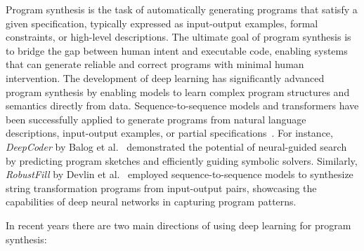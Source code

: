 \documentclass[pdflatex,sn-mathphys-num]{sn-jnl}%
\theoremstyle{thmstyleone}%
\theoremstyle{thmstyletwo}%
\theoremstyle{thmstylethree}%
\begin{document}
Program synthesis is the task of automatically generating programs that satisfy a given specification, typically expressed as input-output examples, formal constraints, or high-level descriptions. The ultimate goal of program synthesis is to bridge the gap between human intent and executable code, enabling systems that can generate reliable and correct programs with minimal human intervention. The development of deep learning has significantly advanced program synthesis by enabling models to learn complex program structures and semantics directly from data. Sequence-to-sequence models and transformers have been successfully applied to generate programs from natural language descriptions, input-output examples, or partial specifications~\cite{devlin2017robustfill, balog2017deepcoder}. For instance, \textit{DeepCoder} by Balog et al.~\cite{balog2017deepcoder} demonstrated the potential of neural-guided search by predicting program sketches and efficiently guiding symbolic solvers. Similarly, \textit{RobustFill} by Devlin et al.~\cite{devlin2017robustfill} employed sequence-to-sequence models to synthesize string transformation programs from input-output pairs, showcasing the capabilities of deep neural networks in capturing program patterns.

In recent years there are two main directions of using deep learning for program synthesis:
\end{document}
